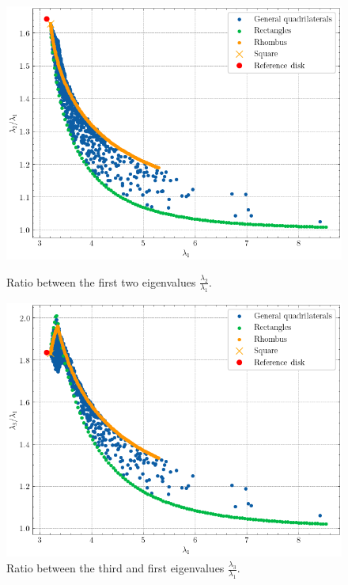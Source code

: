 \begin{figure}[!htb]
    \begin{minipage}[c]{0.41\textwidth}
        \centering
        \includegraphics[width=\textwidth]{Images/Dirac/quad/benguria_quad.png}
        \captionsetup{width=0.8\linewidth} %
        \caption{Ratio between the first two eigenvalues \(\frac{\lambda_2}{\lambda_1}\).}
        \label{dirac_benguria_quad}
    \end{minipage}
    \hfill
    \begin{minipage}[c]{0.50\textwidth}
        \centering
        \includegraphics[width=\textwidth]{Images/Dirac/quad/generalized_benguria_quad.png}
        \captionsetup{width=0.8\linewidth} %
        \caption{Ratio between the third and first eigenvalues \(\frac{\lambda_3}{\lambda_1}\).}
        \label{dirac_generalized_benguria_quad}
    \end{minipage}
    \vspace{0.5cm}
\end{figure}

